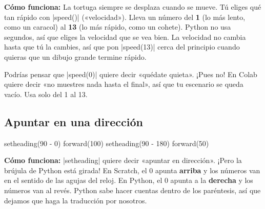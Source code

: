 \textbf{Cómo funciona:} La tortuga siempre se desplaza cuando se mueve. Tú eliges qué tan rápido con \py|speed()| («velocidad»). Lleva un número del \textbf{1} (lo más lento, como un caracol) al \textbf{13} (lo más rápido, como un cohete). Python no usa segundos, así que eliges la velocidad que se vea bien. La velocidad no cambia hasta que tú la cambies, así que pon \py|speed(13)| cerca del principio cuando quieras que un dibujo grande termine rápido.

\begin{watchout}
Podrías pensar que \py|speed(0)| quiere decir «quédate quieta». ¡Pues no! En Colab quiere decir «no muestres nada hasta el final», así que tu escenario se queda vacío. Usa solo del 1 al 13.
\end{watchout}

\subsection*{Apuntar en una dirección}

\begin{tcbraster}[raster columns=2, raster equal height=rows, raster column skip=12pt, raster valign=center]
\begin{tcolorbox}[colback=white, colframe=white, boxrule=0pt, valign=center]
\begin{scratch}
\end{scratch}
\end{tcolorbox}
\begin{code}
setheading(90 - 0)
forward(100)
setheading(90 - 180)
forward(50)
\end{code}
\end{tcbraster}

\textbf{Cómo funciona:} \py|setheading| quiere decir «apuntar en dirección». ¡Pero la brújula de Python está girada! En Scratch, el 0 apunta \textbf{arriba} y los números van en el sentido de las agujas del reloj. En Python, el 0 apunta a la \textbf{derecha} y los números van al revés. Python sabe hacer cuentas dentro de los paréntesis, así que dejamos que haga la traducción por nosotros.

